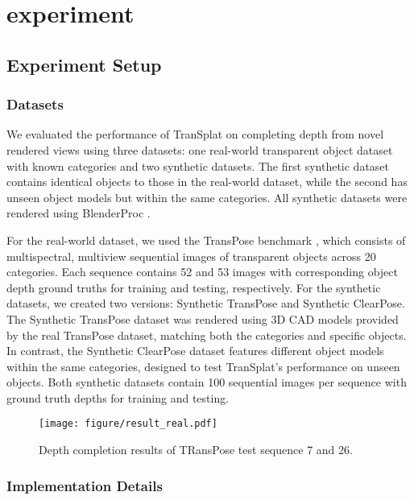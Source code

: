 \section{experiment}
\label{sec:experiment}
\subsection{Experiment Setup}  
\subsubsection{Datasets}



We evaluated the performance of TranSplat on completing depth from novel rendered views using three datasets: one real-world transparent object dataset with known categories and two synthetic datasets. The first synthetic dataset contains identical objects to those in the real-world dataset, while the second has unseen object models but within the same categories. All synthetic datasets were rendered using BlenderProc \cite{blender}.

For the real-world dataset, we used the TransPose benchmark \cite{kim2024transpose}, which consists of multispectral, multiview sequential images of transparent objects across 20 categories. Each sequence contains 52 and 53 images with corresponding object depth ground truths for training and testing, respectively. For the synthetic datasets, we created two versions: Synthetic TransPose and Synthetic ClearPose. The Synthetic TransPose dataset was rendered using 3D CAD models provided by the real TransPose dataset, matching both the categories and specific objects. In contrast, the Synthetic ClearPose dataset features different object models within the same categories, designed to test TranSplat's performance on unseen objects. Both synthetic datasets contain 100 sequential images per sequence with ground truth depths for training and testing.
\begin{figure*}[]
    \centering
    \texttt{[image: figure/result\_real.pdf]}
    \caption{Depth completion results of TRansPose test sequence 7 and 26. }
    \label{fig:real}
    \vspace{-2mm}
\end{figure*}


\subsubsection{Implementation Details}


